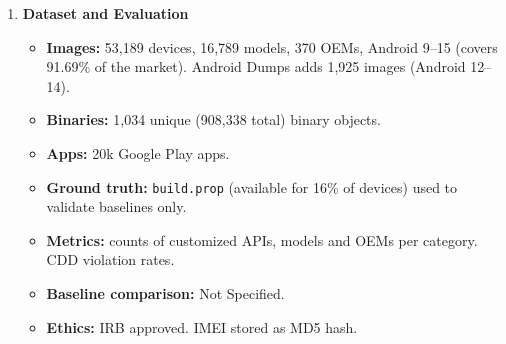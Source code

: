 \documentclass[11pt,a4paper]{article}
\newcommand{\entrypart}[1]{\textbf{\color{accent}#1}\par\vspace{2pt}}
\begin{document}
\begin{enumerate}
    \textbf{Differential code analysis (diffing)} of OEM TLS components against the matching AOSP baseline.

    \begin{itemize}
        \item \textbf{Image collection:} FirmwareScanner (crowd-sourced app) + Android Dumps. Rooted devices excluded.
        \item \textbf{Baseline identification}
        \begin{itemize}
            \item Map BUILD\_ID in the build fingerprint to an AOSP release.
            \item 58\% of devices have BUILD\_IDs not matching known releases. Fallbacks: OEM-claimed version, compile dates.
            \item Validated with \texttt{build.prop} from 8,573 devices: only 12 (0.14\%) conflicting.
        \end{itemize}
        \item \textbf{Java diffing} (JSSE, JCE): decompile to Smali (baksmali, oat2dex). Detect added/removed functions and changed logic. Handle obfuscation (seen in 12\% of samples).
        \item \textbf{Binary diffing} (JCA): IDA Pro + Diaphora. Export-symbol diff and control-flow diff (manual check if 5+ blocks differ).
        \item \textbf{Root store diffing:} OpenSSL toolkit on 68,385 X.509 certificates vs AOSP 9--14. Cross-checked with news, AOSP logs, Mozilla.
        \item \textbf{Taxonomy:} CONN, ACP, CFC, CryptP, TRS, CertM, EV.
        \item \textbf{App impact:} static search of 20k Google Play apps for calls to customized APIs. PoC for one finding.
    \end{itemize}

    \item \entrypart{Dataset and Evaluation}

    \begin{itemize}
        \item \textbf{Images:} 53,189 devices, 16,789 models, 370 OEMs, Android 9--15 (covers 91.69\% of the market). Android Dumps adds 1,925 images (Android 12--14).
        \item \textbf{Binaries:} 1,034 unique (908,338 total) binary objects.
        \item \textbf{Apps:} 20k Google Play apps.
        \item \textbf{Ground truth:} \texttt{build.prop} (available for 16\% of devices) used to validate baselines only.
        \item \textbf{Metrics:} counts of customized APIs, models and OEMs per category. CDD violation rates.
        \item \textbf{Baseline comparison:} Not Specified.
        \item \textbf{Ethics:} IRB approved. IMEI stored as MD5 hash.
    \end{itemize}


\end{enumerate}
\end{document}
